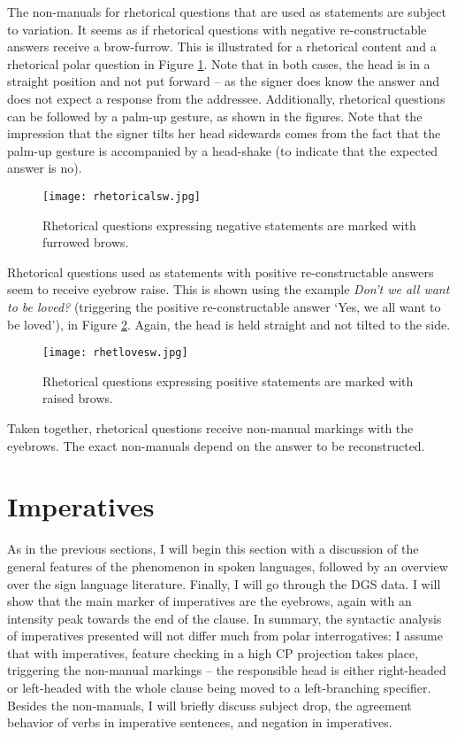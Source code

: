 The non-manuals for rhetorical questions that are used as statements are subject to variation. It seems as if rhetorical questions with negative re-constructable answers receive a brow-furrow. This is illustrated for a rhetorical content and a rhetorical polar question in Figure \ref{rhetorical}. Note that in both cases, the head is in a straight position and not put forward -- as the signer does know the answer and does not expect a response from the addressee. Additionally, rhetorical questions can be followed by a palm-up gesture, as shown in the figures. Note that the impression that the signer tilts her head sidewards comes from the fact that the palm-up gesture is accompanied by a head-shake (to indicate that the expected answer is no).

\begin{figure}[bt]
\centering
	\texttt{[image: rhetoricalsw.jpg]}
	\caption{Rhetorical questions expressing negative statements are marked with furrowed brows.}
	\label{rhetorical}
\end{figure}
Rhetorical questions used as statements with positive re-constructable answers seem to receive eyebrow raise. This is shown using the example \textit{Don't we all want to be loved?} (triggering the positive re-constructable answer `Yes, we all want to be loved'), in Figure \ref{rhetlove}. Again, the head is held straight and not tilted to the side.

\begin{figure}[bt]
\centering
	\texttt{[image: rhetlovesw.jpg]}
	\caption{Rhetorical questions expressing positive statements are marked with raised brows.}
	\label{rhetlove}
\end{figure}

Taken together, rhetorical questions receive non-manual markings with the eyebrows. The exact non-manuals depend on the answer to be reconstructed.


\section{Imperatives}\label{generalsectionimperatives}
As in the previous sections, I will begin this section with a discussion of the general features of the phenomenon in spoken languages, followed by an overview over the sign language literature. Finally, I will go through the DGS data. I will show that the main marker of imperatives are the eyebrows, again with an intensity peak towards the end of the clause. In summary, the syntactic analysis of imperatives presented will not differ much from polar interrogatives: I assume that with imperatives, feature checking in a high CP projection takes place, triggering the non-manual markings -- the responsible head is either right-headed or left-headed with the whole clause being moved to a left-branching specifier. Besides the non-manuals, I will briefly discuss subject drop, the agreement behavior of verbs in imperative sentences, and negation in imperatives.

